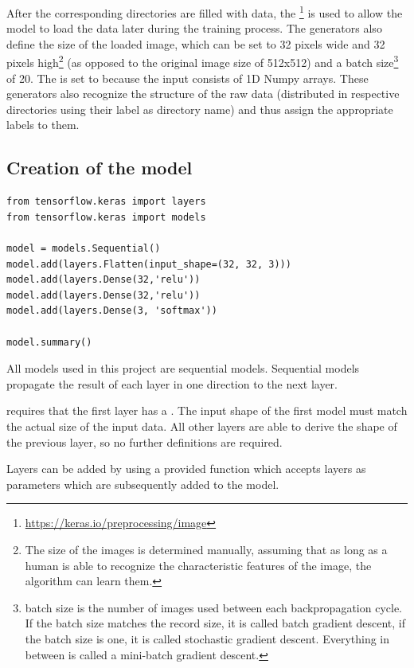 After the corresponding directories are filled with data, the \footnote{\url{https://keras.io/preprocessing/image}} is used to allow the model to load the data later during the training process.
The generators also define the size of the loaded image, which can be set to 32 pixels wide and 32 pixels high\footnote{The size of the images is determined manually, assuming that as long as a human is able to recognize the characteristic features of the image, the algorithm can learn them.} (as opposed to the original image size of 512x512) and a batch size\footnote{batch size is the number of images used between each backpropagation cycle.
If the batch size matches the record size, it is called batch gradient descent, if the batch size is one, it is called stochastic gradient descent.
Everything in between is called a mini-batch gradient descent.} of 20.
The  is set to  because the input consists of 1D Numpy arrays.
These generators also recognize the structure of the raw data (distributed in respective directories using their label as directory name) and thus assign the appropriate labels to them.

\subsection{Creation of the model}

\begin{lstlisting}[label={lst:first_model}]
from tensorflow.keras import layers
from tensorflow.keras import models

model = models.Sequential()
model.add(layers.Flatten(input_shape=(32, 32, 3)))
model.add(layers.Dense(32,'relu'))
model.add(layers.Dense(32,'relu'))
model.add(layers.Dense(3, 'softmax'))

model.summary()
\end{lstlisting}

All models used in this project are sequential models.
Sequential models propagate the result of each layer in one direction to the next layer.

 requires that the first layer has a .
The input shape of the first model must match the actual size of the input data.
All other layers are able to derive the shape of the previous layer, so no further definitions are required.

Layers can be added by using a provided  function which accepts layers as parameters which are subsequently added to the model.

